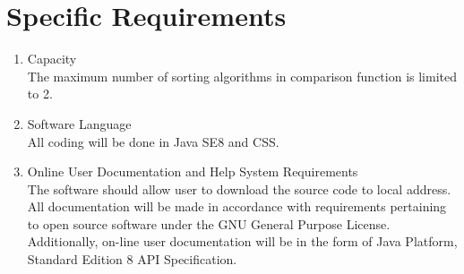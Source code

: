 \documentclass[12pt]{article}
\begin{document}
\section{Specific Requirements}
\label{sec:spec requ}


\begin{enumerate}
\item Capacity\\The maximum number of sorting algorithms in comparison function is limited to 2. 

\item Software Language\\ All coding will be done in Java SE8 and CSS.  

\item Online User Documentation and Help System Requirements\\The software should allow user to download the source code to local address. All documentation will be made in accordance with requirements pertaining to open source software under the GNU General Purpose License. Additionally, on-line user documentation will be in the form of Java Platform, Standard Edition 8 API Specification.

\end{enumerate}
\end{document}
